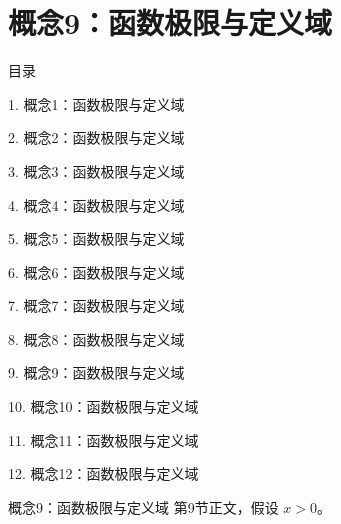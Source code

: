 \documentclass[aspectratio=169,10pt,fontset=fandol]{ctexbeamer}
\begin{document}
\section{概念9：函数极限与定义域}
\begin{frame}[t,fragile]{目录}
\small
{\color{black}\small 1. 概念1：函数极限与定义域\par}\vspace{0.22em}
{\color{black}\small 2. 概念2：函数极限与定义域\par}\vspace{0.22em}
{\color{black}\small 3. 概念3：函数极限与定义域\par}\vspace{0.22em}
{\color{black}\small 4. 概念4：函数极限与定义域\par}\vspace{0.22em}
{\color{black}\small 5. 概念5：函数极限与定义域\par}\vspace{0.22em}
{\color{black}\small 6. 概念6：函数极限与定义域\par}\vspace{0.22em}
{\color{black}\small 7. 概念7：函数极限与定义域\par}\vspace{0.22em}
{\color{black}\small 8. 概念8：函数极限与定义域\par}\vspace{0.22em}
{\color{blue}\small 9. 概念9：函数极限与定义域\par}\vspace{0.22em}
{\color{gray!40}\small 10. 概念10：函数极限与定义域\par}\vspace{0.22em}
{\color{gray!40}\small 11. 概念11：函数极限与定义域\par}\vspace{0.22em}
{\color{gray!40}\small 12. 概念12：函数极限与定义域\par}\vspace{0.22em}
\end{frame}
\begin{frame}[t,fragile]{概念9：函数极限与定义域}
\normalsize
{\normalsize
第9节正文，假设 $x>0$。
}
\end{frame}
\end{document}
